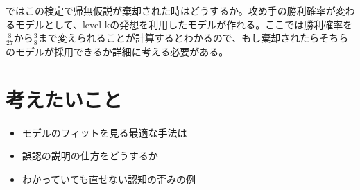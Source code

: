 \documentclass{jsarticle}
\begin{document}
ではこの検定で帰無仮説が棄却された時はどうするか。攻め手の勝利確率が変わるモデルとして、level-kの発想を利用したモデルが作れる。ここでは勝利確率を$\frac{8}{27}$から$\frac{3}{8}$まで変えられることが計算するとわかるので、もし棄却されたらそちらのモデルが採用できるか詳細に考える必要がある。

\section{考えたいこと}
\begin{itemize}
	\item モデルのフィットを見る最適な手法は
	\item 誤認の説明の仕方をどうするか
	\item わかっていても直せない認知の歪みの例
\end{itemize}
\end{document}
